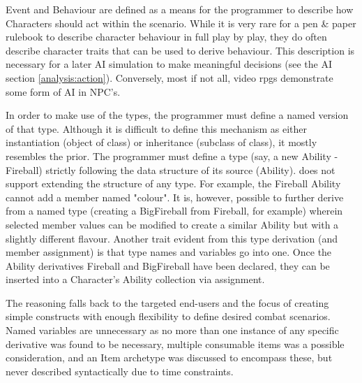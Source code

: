 Event and Behaviour are defined as a means for the programmer to describe how Characters should act within the scenario. While it is very rare for a pen \& paper rulebook to describe character behaviour in full play by play, they do often describe character traits that can be used to derive behaviour. This description is necessary for a later AI simulation to make meaningful decisions (see the AI section \vref{analysis:action}). %
Conversely, most if not all, video \ac{rpgs} demonstrate some form of AI in NPC's.

In order to make use of the types, the programmer must define a named version of that type. Although it is difficult to define this mechanism as either instantiation (object of class) or inheritance (subclass of class), it mostly resembles the prior. The programmer must define a type (say, a new Ability - Fireball) strictly following the data structure of its source (Ability). \langname{} does not support extending the structure of any type. For example, the Fireball Ability cannot add a member named "colour". It is, however, possible to further derive from a named type (creating a BigFireball from Fireball, for example) wherein selected member values can be modified to create a similar Ability but with a slightly different flavour. Another trait evident from this type derivation (and member assignment) is that type names and variables go into one. Once the Ability derivatives Fireball and BigFireball have been declared, they can be inserted into a Character's Ability collection via assignment.

The reasoning falls back to the targeted end-users and the focus of creating simple constructs with enough flexibility to define desired combat scenarios. Named variables are unnecessary as no more than one instance of any specific derivative was found to be necessary, multiple consumable items was a possible consideration, and an Item archetype was discussed to encompass these, but never described syntactically due to time constraints.
